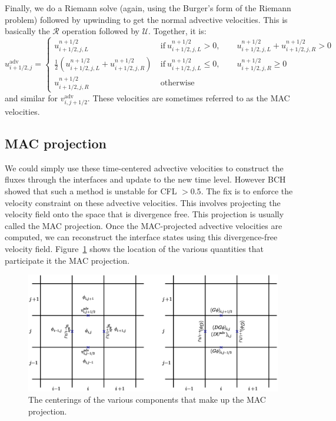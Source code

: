 Finally, we do a Riemann solve (again, using the Burger's form of the
Riemann problem) followed by upwinding to get the normal advective
velocities.  This is basically the $\mathcal{R}$ operation followed 
by $\mathcal{U}$.  Together, it is:
\begin{equation}
u^\mathrm{adv}_{i+1/2,j} = \left \{ \begin{array}{cl}
   u_{i+1/2,j,L}^{n+1/2}  & 
         \mathrm{~if~} u_{i+1/2,j,L}^{n+1/2} > 0, \qquad 
                       u_{i+1/2,j,L}^{n+1/2} + u_{i+1/2,j,R}^{n+1/2} > 0 \\
   \frac{1}{2} \left ( u_{i+1/2,j,L}^{n+1/2} +
                       u_{i+1/2,j,R}^{n+1/2} \right )  &
          \mathrm{~if~} u_{i+1/2,j,L}^{n+1/2} \le 0, \qquad 
                        u_{i+1/2,j,R}^{n+1/2} \ge 0 \\
   u_{i+1/2,j,R}^{n+1/2}  & \mathrm{~otherwise}
  \end{array}
  \right .
\end{equation}
and similar for $v^\mathrm{adv}_{i,j+1/2}$.  
These velocities are sometimes referred to as the MAC velocities.


\subsection{MAC projection}

We could simply use these time-centered advective velocities to
construct the fluxes through the interfaces and update to the new time
level.  However BCH showed that such a method is unstable for CFL $>
0.5$.  The fix is to enforce the velocity constraint on these advective
velocities.  This involves projecting the velocity field onto the
space that is divergence free.  This projection is usually called the
MAC projection.  Once the MAC-projected advective velocities are
computed, we can reconstruct the interface states using this
divergence-free velocity field.  Figure~\ref{fig:incomp:MACsolve}
shows the location of the various quantities that participate
it the MAC projection.

\begin{figure}[t]
\centering
\includegraphics[width=\linewidth]{MAC_solve}
\caption{\label{fig:incomp:MACsolve} The centerings of the various
components that make up the MAC projection.}
\end{figure}

